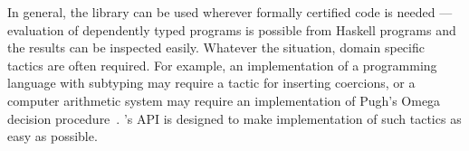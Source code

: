 In general, the library can be used wherever formally certified code
is needed --- evaluation of dependently typed \Ivor{} programs is
possible from Haskell programs and the results can be inspected easily.
Whatever the situation, domain specific tactics are often
required. For example, 
an implementation of a programming language with subtyping may require
a tactic for inserting coercions, or
a computer arithmetic system may require an
implementation of Pugh's Omega decision procedure~\cite{pugh-omega}.
\Ivor{}'s API is designed to make implementation of such tactics as
easy as possible.


